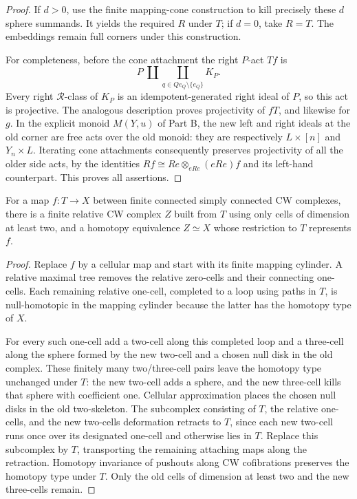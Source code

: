 \begin{proof}
If $d>0$, use the finite mapping-cone construction to kill precisely these
$d$ sphere summands. It yields the required $R$ under $T$; if $d=0$, take
$R=T$. The embeddings remain full corners under this construction.

For completeness, before the cone attachment the right $P$-act $Tf$ is
\[
 P\ \amalg\!\coprod_{q\in Qe_Q\setminus\{e_Q\}} K_P.
\]
Every right $\mathcal R$-class of $K_P$ is an idempotent-generated right
ideal of $P$, so this act is projective. The analogous description proves
projectivity of $fT$, and likewise for $g$. In the explicit monoid
$M(Y,u)$ of Part B, the new left and right ideals at the old corner are
free acts over the old monoid: they are respectively $L\times[n]$ and
$Y_n\times L$. Iterating cone attachments consequently preserves
projectivity of all the older side acts, by the identities
$R f\cong R e\otimes_{eRe}(eRe)f$ and its left-hand counterpart.
This proves all assertions.
\end{proof}

\begin{lemma}
\label{D:relative-cell-trading}
For a map $f:T\to X$ between finite connected simply connected CW
complexes, there is a finite relative CW complex $Z$ built from $T$ using
only cells of dimension at least two, and a homotopy equivalence $Z\simeq X$
whose restriction to $T$ represents $f$.
\end{lemma}
\begin{proof}
Replace $f$ by a cellular map and start with its finite mapping cylinder.
A relative maximal tree removes the relative zero-cells and their
connecting one-cells. Each remaining relative one-cell, completed to a
loop using paths in $T$, is null-homotopic in the mapping cylinder because
the latter has the homotopy type of $X$.

For every such one-cell add a two-cell along this completed loop and a
three-cell along the sphere formed by the new two-cell and a chosen null
disk in the old complex. These finitely many two/three-cell pairs leave
the homotopy type unchanged under $T$: the new two-cell adds a sphere,
and the new three-cell kills that sphere with coefficient one. Cellular
approximation places the chosen null disks in the old two-skeleton.
The subcomplex consisting of $T$, the relative one-cells, and the new
two-cells deformation retracts to $T$, since each new two-cell runs once
over its designated one-cell and otherwise lies in $T$. Replace this
subcomplex by $T$, transporting the remaining attaching maps along the
retraction. Homotopy invariance of pushouts along CW cofibrations preserves
the homotopy type under $T$. Only the old cells of dimension at least two
and the new three-cells remain.
\end{proof}

